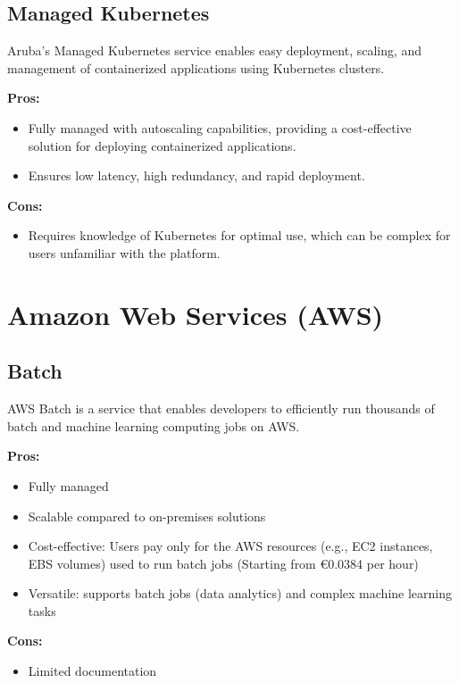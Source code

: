 \subsection*{Managed Kubernetes}
Aruba's Managed Kubernetes service enables easy deployment, scaling, and management of containerized applications using Kubernetes clusters.

\textbf{Pros:}
\begin{itemize}
    \item Fully managed with autoscaling capabilities, providing a cost-effective solution for deploying containerized applications.
    \item Ensures low latency, high redundancy, and rapid deployment.
\end{itemize}

\textbf{Cons:}
\begin{itemize}
    \item Requires knowledge of Kubernetes for optimal use, which can be complex for users unfamiliar with the platform.
\end{itemize}


\section{Amazon Web Services (AWS)}
\label{aws}

\subsection*{Batch}
\label{aws:batch}
AWS Batch is a service that enables developers to efficiently run thousands of batch and machine learning computing jobs on AWS.

\textbf{Pros:}
\begin{itemize}
    \item Fully managed
    \item Scalable compared to on-premises solutions
    \item Cost-effective: Users pay only for the AWS resources (e.g., EC2 instances, EBS volumes) used to run batch jobs (Starting from €0.0384 per hour)
    \item Versatile: supports batch jobs (data analytics) and complex machine learning tasks
\end{itemize}

\textbf{Cons:}
\begin{itemize}
    \item Limited documentation
\end{itemize}

